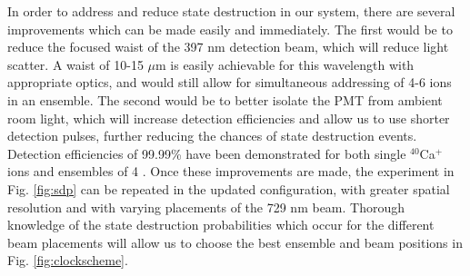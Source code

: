 In order to address and reduce state destruction in our system, there are several improvements which can be made easily and immediately. The first would be to reduce the focused waist of the 397 nm detection beam, which will reduce light scatter. A waist of 10-15 $\mu$m is easily achievable for this wavelength with appropriate optics, and would still allow for simultaneous addressing of 4-6 ions in an ensemble. The second would be to better isolate the PMT from ambient room light, which will increase detection efficiencies and allow us to use shorter detection pulses, further reducing the chances of state destruction events. Detection efficiencies of 99.99\% have been demonstrated for both single $^{40}$Ca$^+$ ions and ensembles of 4 \cite{PhysRevLett.100.200502, PhysRevA.81.040302}.  Once these improvements are made, the experiment in Fig. \ref{fig:sdp} can be repeated in the updated configuration, with greater spatial resolution and with varying placements of the 729 nm beam. Thorough knowledge of the state destruction probabilities which occur for the different beam placements will allow us to choose the best ensemble and beam positions in Fig. \ref{fig:clockscheme}. 











